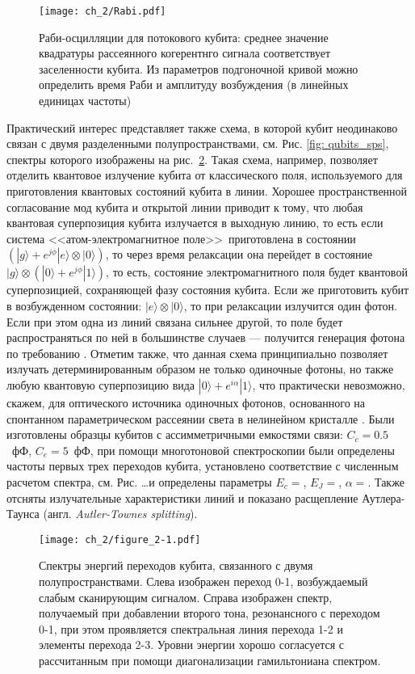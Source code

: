 \begin{figure}[thb]\center
	\texttt{[image: ch\_2/Rabi.pdf]}
	\caption{Раби-осцилляции для потокового кубита: среднее значение квадратуры рассеянного когерентнго сигнала соответствует заселенности кубита. Из параметров подгоночной кривой	можно определить время Раби и амплитуду возбуждения (в линейных единицах частоты)}
	\label{fig:qosc}
\end{figure}
Практический интерес представляет также схема, в которой кубит неодинаково связан с двумя разделенными полупространствами, см. Рис. \ref{fig: qubits_sps}, спектры которого изображены на рис.~\ref{fig: spectra_sps}. Такая схема, например, позволяет отделить квантовое излучение кубита от классического поля, используемого для приготовления квантовых состояний кубита в линии. Хорошее пространственной согласование мод кубита и открытой линии приводит к тому, что любая квантовая суперпозиция кубита излучается в выходную линию, то есть если система <<атом-электромагнитное поле>>~приготовлена в  состоянии $(|g\rangle + e^{j\phi}|e\rangle \otimes |0\rangle)$, то через время релаксации она перейдет в состояние $|g\rangle \otimes (|0\rangle + e^{j\phi}|1\rangle)$, то есть, состояние электромагнитного поля будет квантовой суперпозицией, сохраняющей фазу состояния кубита. Если же приготовить кубит в возбужденном состоянии: $|e\rangle \otimes |0\rangle$, то при релаксации излучится один фотон. Если при этом одна из линий связана сильнее другой, то поле будет распространяться по ней в большинстве случаев --- получится генерация фотона по требованию \cite{peng2016tuneable}. Отметим также, что данная схема принципиально позволяет излучать детерминированным образом не только одиночные фотоны, но также любую квантовую суперпозицию вида $|0\rangle + e^{i\alpha}|1\rangle$, что практически невозможно, скажем, для оптического источника одиночных фотонов, основанного на спонтанном параметрическом рассеянии света в нелинейном кристалле \cite{grangier1986experimental}. Были изготовлены образцы кубитов с ассимметричными емкостями связи: $C_c=0.5$~фФ, $C_e=5$~фФ, при помощи многотоновой спектроскопии были определены частоты первых трех переходов кубита, установлено соответствие с численным расчетом спектра, см. Рис. \dots и определены параметры $E_c=$, $E_J=$, $\alpha=$. Также отсняты излучательные характеристики линий и показано расщепление Аутлера-Таунса (англ. \textit{Autler-Townes splitting}). 
\begin{figure}[htb]\center
	\texttt{[image: ch\_2/figure\_2-1.pdf]}
	\caption{Спектры энергий переходов кубита, связанного с двумя полупространствами. Слева изображен переход 0-1, возбуждаемый слабым сканирующим сигналом. Справа изображен спектр, получаемый при добавлении второго тона, резонансного с переходом 0-1, при этом проявляется спектральная линия перехода 1-2 и элементы перехода 2-3. Уровни энергии хорошо согласуется с рассчитанным при помощи диагонализации гамильтониана спектром.  }
	\label{fig: spectra_sps}
\end{figure}

